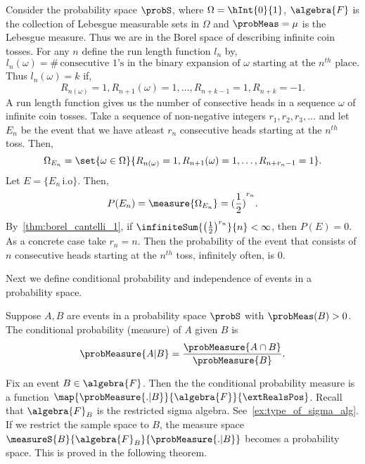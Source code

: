 \begin{Example}[name=Run lengths]
    Consider the probability space $\probS$, where $\Omega = \hInt{0}{1}$, $\algebra{F}$ is the
    collection of Lebesgue measurable sets in $\Omega$ and $\probMeas = \mu$ is the Lebesgue
    measure. Thus we are in the Borel space of describing infinite coin tosses. For any $n$ define
    the run length function $l_n$ by,
    \begin{equation*}
	l_n(\omega) = \# \,\text{consecutive $1$'s in the binary expansion of $\omega$ starting at
	    the $n^{th}$ place}.
    \end{equation*}
    Thus $l_n(\omega) = k$ if,\[R_{n(\omega)} = 1, R_{n+1}(\omega) = 1,\ldots,R_{n+k-1} = 1,R_{n+k} =
	-1.\]
    A run length function gives us the number of consective heads in a sequence $\omega$ of
    infinite coin tosses. Take a sequence of non-negative integers $r_1,r_2,r_3,\ldots$ and let
    $E_n$ be the event that we have atleast $r_n$ consecutive heads starting at the $n^{th}$ toss. 
    Then, 
    \[\Omega_{E_n} = \set{\omega\in\Omega}{R_{n(\omega)} = 1, R_{n+1}(\omega) = 1,\ldots,R_{n+r_n-1} 
	    = 1}.\]
    Let $E = \lbrace E_n\,\text{i.o} \rbrace$. Then,
    \[P(E_n) = \measure{\Omega_{E_n}} = {(\frac{1}{2})}^{r_n}.\]
    By~\ref{thm:borel_cantelli_1}, if $\infiniteSum{{\left(\frac{1}{2}\right)}^{r_n}}{n} < \infty$, then
    $P(E) = 0$. As a concrete case take $r_n = n$. Then the probability of the event that consists
    of $n$ consecutive heads starting at the $n^{th}$ toss, infinitely often, is $0$.
\end{Example}
Next we define conditional probability and independence of events in a probability space.
\begin{Definition}[name=Conditional probability measure]
    Suppose $A,B$ are events in a probability space $\probS$ with $\probMeas(B) > 0$. The
    conditional probability (measure) of $A$ given $B$ is 
    \[\probMeasure{A|B} = \frac{\probMeasure{A\cap B}}{\probMeasure{B}}.\]
\end{Definition}
\begin{Remark}
    Fix an event $B \in \algebra{F}$. Then the the conditional probability measure is a 
    function $\map{\probMeasure{.|B}}{\algebra{F}}{\extRealsPos}$. Recall that $\algebra{F}_{B}$ is the
    restricted sigma algebra. See~\ref{ex:type_of_sigma_alg}. If we restrict the sample space to $B$, the measure space
    $\measureS{B}{\algebra{F}_{B}}{\probMeasure{.|B}}$ becomes a probability space. This is proved in the
    following theorem.
\end{Remark}
